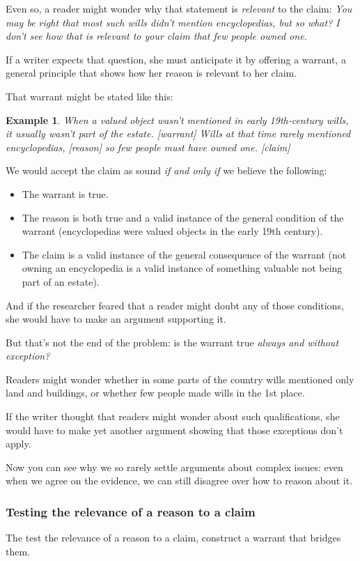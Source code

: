 \documentclass[oneside]{book}
\numberwithin{equation}{section}
\newtheorem{example}{Example}[section]
\begin{document}
Even so, a reader might wonder why that statement is \textit{relevant} to the claim: \textit{You may be right that most such wills didn't mention encyclopedias, but so what? I don't see how that is relevant to your claim that few people owned one}.

If a writer expects that question, she must anticipate it by offering a warrant, a general principle that shows how her reason is relevant to her claim.

%
That warrant might be stated like this:
\begin{example}
    When a valued object wasn't mentioned in early 19th-century wills, it usually wasn't part of the estate. \emph{[warrant]} Wills at that time rarely mentioned encyclopedias, \emph{[reason]} so few people must have owned one. \emph{[claim]}
\end{example}
We would accept the claim as sound \textit{if and only if} we believe the following:
\begin{itemize}
    \item The warrant is true.
    \item The reason is both true and a valid instance of the general condition of the warrant (encyclopedias were valued objects in the early 19th century).
    \item The claim is a valid instance of the general consequence of the warrant (not owning an encyclopedia is a valid instance of something valuable not being part of an estate).
\end{itemize}
And if the researcher feared that a reader might doubt any of those conditions, she would have to make an argument supporting it.

%
But that's not the end of the problem: is the warrant true \textit{always and without exception?}

Readers might wonder whether in some parts of the country wills mentioned only land and buildings, or whether few people made wills in the 1st place.

If the writer thought that readers might wonder about such qualifications, she would have to make yet another argument showing that those exceptions don't apply.

%
Now you can see why we so rarely settle arguments about complex issues: even when we agree on the evidence, we can still disagree over how to reason about it.

\subsubsection{Testing the relevance of a reason to a claim}
The test the relevance of a reason to a claim, construct a warrant that bridges them.
\end{document}
